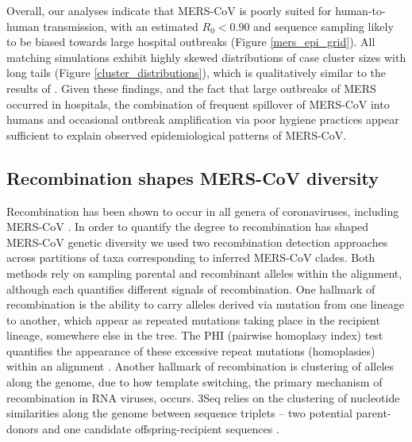 \documentclass[9pt,lineno]{elife}
\begin{document}
Overall, our analyses indicate that MERS-CoV is poorly suited for human-to-human transmission, with an estimated $R_{0}<0.90$ and sequence sampling likely to be biased towards large hospital outbreaks (Figure \ref{mers_epi_grid}).
All matching simulations exhibit highly skewed distributions of case cluster sizes with long tails (Figure \ref{cluster_distributions}), which is qualitatively similar to the results of \citep{cauchemez_unraveling_2016}.
Given these findings, and the fact that large outbreaks of MERS occurred in hospitals, the combination of frequent spillover of MERS-CoV into humans and occasional outbreak amplification via poor hygiene practices \citep{assiri_hospital_2013,chen_comparative_2017} appear sufficient to explain observed epidemiological patterns of MERS-CoV.


\subsection*{Recombination shapes MERS-CoV diversity}
Recombination has been shown to occur in all genera of coronaviruses, including MERS-CoV \citep{lai_1985,makino_1986,keck_1988,kottier_1995,herrewegh_1998}.
In order to quantify the degree to recombination has shaped MERS-CoV genetic diversity we used two recombination detection approaches across partitions of taxa corresponding to inferred MERS-CoV clades.
Both methods rely on sampling parental and recombinant alleles within the alignment, although each quantifies different signals of recombination.
One hallmark of recombination is the ability to carry alleles derived via mutation from one lineage to another, which appear as repeated mutations taking place in the recipient lineage, somewhere else in the tree.
The PHI (pairwise homoplasy index) test quantifies the appearance of these excessive repeat mutations (homoplasies) within an alignment \citep{bruen_simple_2006}.
Another hallmark of recombination is clustering of alleles along the genome, due to how template switching, the primary mechanism of recombination in RNA viruses, occurs.
3Seq relies on the clustering of nucleotide similarities along the genome between sequence triplets -- two potential parent-donors and one candidate offspring-recipient sequences \citep{boni_exact_2007}.
\end{document}
